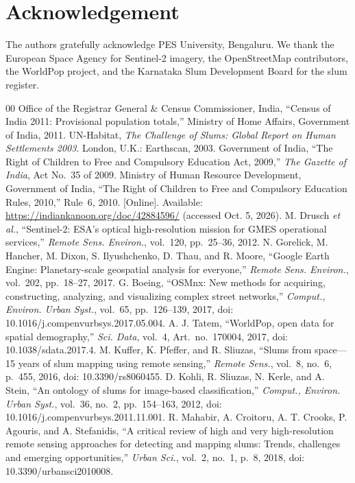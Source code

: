 \documentclass[conference]{IEEEtran}
\begin{document}
\section*{Acknowledgement}
The authors gratefully acknowledge PES University, Bengaluru. We thank the European Space Agency for Sentinel-2 imagery, the OpenStreetMap contributors, the WorldPop project, and the Karnataka Slum Development Board for the slum register.

\begin{thebibliography}{00}
 Office of the Registrar General \& Census Commissioner, India, ``Census of India 2011: Provisional population totals,'' Ministry of Home Affairs, Government of India, 2011.
 UN-Habitat, \textit{The Challenge of Slums: Global Report on Human Settlements 2003}. London, U.K.: Earthscan, 2003.
 Government of India, ``The Right of Children to Free and Compulsory Education Act, 2009,'' \textit{The Gazette of India}, Act No.~35 of 2009.
 Ministry of Human Resource Development, Government of India, ``The Right of Children to Free and Compulsory Education Rules, 2010,'' Rule~6, 2010. [Online]. Available: \url{https://indiankanoon.org/doc/42884596/} (accessed Oct. 5, 2026).
 M. Drusch \textit{et al.}, ``Sentinel-2: ESA's optical high-resolution mission for GMES operational services,'' \textit{Remote Sens. Environ.}, vol.~120, pp.~25--36, 2012.
 N. Gorelick, M. Hancher, M. Dixon, S. Ilyushchenko, D. Thau, and R. Moore, ``Google Earth Engine: Planetary-scale geospatial analysis for everyone,'' \textit{Remote Sens. Environ.}, vol.~202, pp.~18--27, 2017.
 G. Boeing, ``OSMnx: New methods for acquiring, constructing, analyzing, and visualizing complex street networks,'' \textit{Comput., Environ. Urban Syst.}, vol.~65, pp.~126--139, 2017, doi: 10.1016/j.compenvurbsys.2017.05.004.
 A. J. Tatem, ``WorldPop, open data for spatial demography,'' \textit{Sci. Data}, vol.~4, Art.~no.~170004, 2017, doi: 10.1038/sdata.2017.4.
 M. Kuffer, K. Pfeffer, and R. Sliuzas, ``Slums from space---15 years of slum mapping using remote sensing,'' \textit{Remote Sens.}, vol.~8, no.~6, p.~455, 2016, doi: 10.3390/rs8060455.
 D. Kohli, R. Sliuzas, N. Kerle, and A. Stein, ``An ontology of slums for image-based classification,'' \textit{Comput., Environ. Urban Syst.}, vol.~36, no.~2, pp.~154--163, 2012, doi: 10.1016/j.compenvurbsys.2011.11.001.
 R. Mahabir, A. Croitoru, A. T. Crooks, P. Agouris, and A. Stefanidis, ``A critical review of high and very high-resolution remote sensing approaches for detecting and mapping slums: Trends, challenges and emerging opportunities,'' \textit{Urban Sci.}, vol.~2, no.~1, p.~8, 2018, doi: 10.3390/urbansci2010008.

\end{thebibliography}
\end{document}
